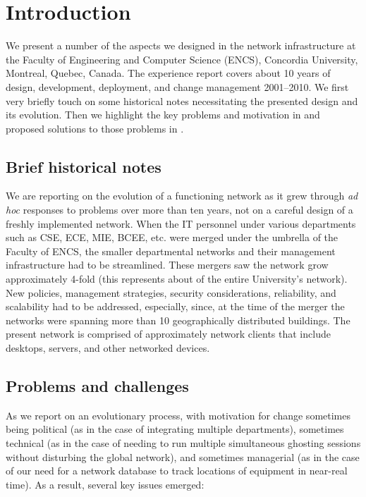 \section{Introduction}
\label{sect:intro}

We present a number of the aspects we designed in the network infrastructure
at the
Faculty of Engineering and Computer Science (ENCS), Concordia University,
Montreal, Quebec, Canada.
The experience report covers about 10 years of
design, development, deployment, and change management 2001--2010. 
We first very briefly touch on some historical notes necessitating the
presented design and its evolution. Then we highlight the key problems and motivation in 
and proposed solutions to those problems in .


\subsection{Brief historical notes}
\label{sect:brief-history}

We are reporting on the evolution of a functioning network as it
grew through {\em ad hoc} responses to problems over more than ten
years, not on a careful design of a freshly implemented network.
When the IT personnel under various departments such as CSE, ECE, MIE, BCEE, etc.
were merged under the umbrella of the Faculty of ENCS, the smaller departmental
networks and their management infrastructure had to be streamlined.
These mergers saw
the network grow approximately 4-fold (this represents about  of the entire University's
network). New policies, management strategies, security
considerations, reliability, and scalability had to be addressed, especially, since, at the
time of the merger the networks were spanning more than 10 geographically
distributed buildings. The present network is comprised of approximately {\netclients}
network clients
that include desktops, servers, and other networked devices.

\subsection{Problems and challenges}
\label{sect:problems}

As we report on an evolutionary process, with motivation for change sometimes being
political (as in the case of integrating multiple departments),
sometimes technical (as in the case of needing to run multiple
simultaneous ghosting sessions without disturbing the global
network), and sometimes managerial (as in the case of our
need for a network database to track locations of equipment
in near-real time).
As a result, several key issues emerged:

